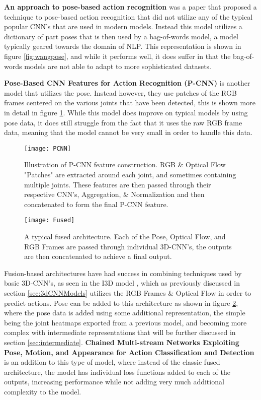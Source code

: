 \textbf{An approach to pose-based action recognition} \cite{WangPose} was a paper that proposed a technique to pose-based action recognition that did not utilize any of the typical popular CNN's that are used in modern models. Instead this model utilizes a dictionary of part poses that is then used by a bag-of-words model, a model typically geared towards the domain of NLP. This representation is shown in figure \ref{fig:wangpose}, and  while it performs well, it does suffer in that the bag-of-words models are not able to adapt to more sophisticated datasets.

\textbf{Pose-Based CNN Features for Action Recognition (P-CNN)} \cite{PCNN} is another model that utilizes the pose. Instead however, they use patches of the RGB frames centered on the various joints that have been detected, this is shown more in detail in figure \ref{fig:pcnn}. While this model does improve on typical models by using pose data, it does still struggle from the fact that it uses the raw RGB frame data, meaning that the model cannot be very small in order to handle this data.

\begin{figure}[ht]
	\texttt{[image: PCNN]}
	\centering
	\caption{Illustration of P-CNN feature construction. RGB \& Optical Flow "Patches" are extracted around each joint, and sometimes containing multiple joints. These features are then passed through their respective CNN's, Aggregation, \& Normalization and then concatenated to form the final P-CNN feature.}
	\label{fig:pcnn}
\end{figure}

\begin{figure}[ht]
	\texttt{[image: Fused]}
	\centering
	\caption{A typical fused architecture. Each of the Pose, Optical Flow, and RGB Frames are passed through individual 3D-CNN's, the outputs are then concatenated to achieve a final output.}
	\label{fig:fused}
\end{figure}

Fusion-based architectures have had success in combining techniques used by basic 3D-CNN's, as seen in the I3D model \cite{i3d}, which as previously discussed in section \ref{sec:3dCNNModels} utilizes the RGB Frames \& Optical Flow in order to predict actions. Pose can be added to this architecture as shown in figure \ref{fig:fused}, where the pose data is added using some additional representation, the simple being the joint heatmaps exported from a previous model, and becoming more complex with intermediate representations that will be further discussed in section \ref{sec:intermediate}. \textbf{Chained Multi-stream Networks Exploiting Pose, Motion, and Appearance for Action Classification and Detection} \cite{Chained} is an addition to this type of model, where instead of the classic fused architecture, the model has individual loss functions added to each of the outputs, increasing performance while not adding very much additional complexity to the model.

